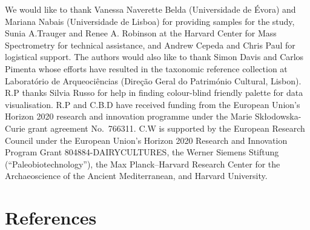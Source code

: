 \documentclass[preprint, 3p, authoryear]{elsarticle} %
\begin{document}
We would like to thank Vanessa Naverette Belda (Universidade de Évora) and Mariana Nabais (Universidade de Lisboa) for providing samples for the study, Sunia A.Trauger and Renee A. Robinson at the Harvard Center for Mass Spectrometry for technical assistance, and Andrew Cepeda and Chris Paul for logistical support. The authors would also like to thank Simon Davis and Carlos Pimenta whose efforts have resulted in the taxonomic reference collection at Laboratório de Arqueociências (Direção Geral do Património Cultural, Lisbon). R.P thanks Silvia Russo for help in finding colour-blind friendly palette for data visualisation. R.P and C.B.D have received funding from the European Union's Horizon 2020 research and innovation programme under the Marie Skłodowska-Curie grant agreement No.~766311. C.W is supported by the European Research Council under the European Union's Horizon 2020 Research and Innovation Program Grant 804884-DAIRYCULTURES, the Werner Siemens Stiftung (``Paleobiotechnology''), the Max Planck--Harvard Research Center for the Archaeoscience of the Ancient Mediterranean, and Harvard University.

\hypertarget{references}{%
\section*{References}\label{references}}
\end{document}
